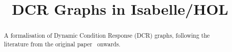 \documentclass[11pt,a4paper]{article}
\begin{document}
\title{DCR Graphs in Isabelle/HOL}
\maketitle

\begin{abstract}
  A formalisation of Dynamic Condition Response (DCR) graphs, following the literature
  from the original paper~\cite{EPTCS69} onwards.
\end{abstract}

\tableofcontents






\end{document}
